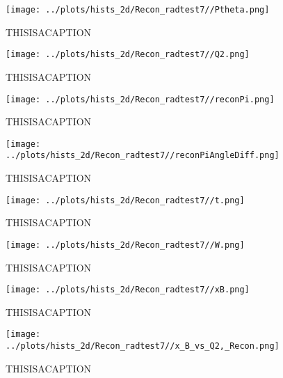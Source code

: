 \documentclass{article}
\begin{document}
\begin{landscape}
    \begin{figure}[ht]
        \centering

        \texttt{[image: ../plots/hists\_2d/Recon\_radtest7//Ptheta.png]}
        \captionsetup{textformat=empty,labelformat=blank}
        \caption{THISISACAPTION}
    \end{figure}
    \clearpage
    
    \begin{figure}[ht]
        \centering

        \texttt{[image: ../plots/hists\_2d/Recon\_radtest7//Q2.png]}
        \captionsetup{textformat=empty,labelformat=blank}
        \caption{THISISACAPTION}
    \end{figure}
    \clearpage
    
    \begin{figure}[ht]
        \centering

        \texttt{[image: ../plots/hists\_2d/Recon\_radtest7//reconPi.png]}
        \captionsetup{textformat=empty,labelformat=blank}
        \caption{THISISACAPTION}
    \end{figure}
    \clearpage
    
    \begin{figure}[ht]
        \centering

        \texttt{[image: ../plots/hists\_2d/Recon\_radtest7//reconPiAngleDiff.png]}
        \captionsetup{textformat=empty,labelformat=blank}
        \caption{THISISACAPTION}
    \end{figure}
    \clearpage
    
    \begin{figure}[ht]
        \centering

        \texttt{[image: ../plots/hists\_2d/Recon\_radtest7//t.png]}
        \captionsetup{textformat=empty,labelformat=blank}
        \caption{THISISACAPTION}
    \end{figure}
    \clearpage
    
    \begin{figure}[ht]
        \centering

        \texttt{[image: ../plots/hists\_2d/Recon\_radtest7//W.png]}
        \captionsetup{textformat=empty,labelformat=blank}
        \caption{THISISACAPTION}
    \end{figure}
    \clearpage
    
    \begin{figure}[ht]
        \centering

        \texttt{[image: ../plots/hists\_2d/Recon\_radtest7//xB.png]}
        \captionsetup{textformat=empty,labelformat=blank}
        \caption{THISISACAPTION}
    \end{figure}
    \clearpage
    
    \begin{figure}[ht]
        \centering

        \texttt{[image: ../plots/hists\_2d/Recon\_radtest7//x\_B\_vs\_Q2,\_Recon.png]}
        \captionsetup{textformat=empty,labelformat=blank}
        \caption{THISISACAPTION}
    \end{figure}
    \clearpage
    
	\end{landscape}
	
\end{document}
